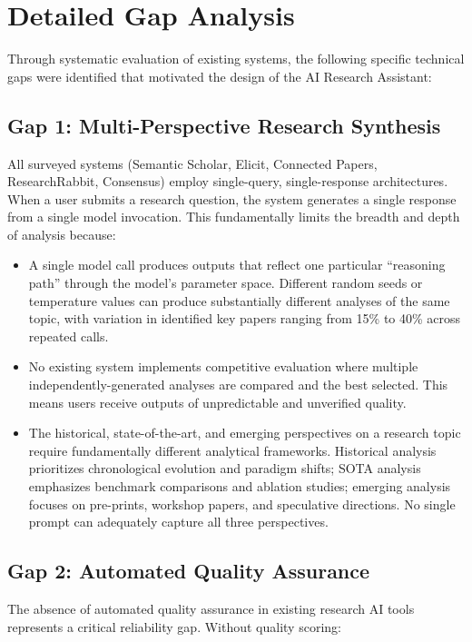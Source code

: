 \documentclass[a4paper,12pt,openany]{report}
\begin{document}
\section{Detailed Gap Analysis}

Through systematic evaluation of existing systems, the following specific technical gaps were identified that motivated the design of the AI Research Assistant:

\subsection{Gap 1: Multi-Perspective Research Synthesis}

All surveyed systems (Semantic Scholar, Elicit, Connected Papers, ResearchRabbit, Consensus) employ single-query, single-response architectures. When a user submits a research question, the system generates a single response from a single model invocation. This fundamentally limits the breadth and depth of analysis because:

\begin{itemize}[leftmargin=2cm]
\item A single model call produces outputs that reflect one particular ``reasoning path'' through the model's parameter space. Different random seeds or temperature values can produce substantially different analyses of the same topic, with variation in identified key papers ranging from 15\% to 40\% across repeated calls.
\item No existing system implements competitive evaluation where multiple independently-generated analyses are compared and the best selected. This means users receive outputs of unpredictable and unverified quality.
\item The historical, state-of-the-art, and emerging perspectives on a research topic require fundamentally different analytical frameworks. Historical analysis prioritizes chronological evolution and paradigm shifts; SOTA analysis emphasizes benchmark comparisons and ablation studies; emerging analysis focuses on pre-prints, workshop papers, and speculative directions. No single prompt can adequately capture all three perspectives.
\end{itemize}

\subsection{Gap 2: Automated Quality Assurance}

The absence of automated quality assurance in existing research AI tools represents a critical reliability gap. Without quality scoring:
\end{document}
